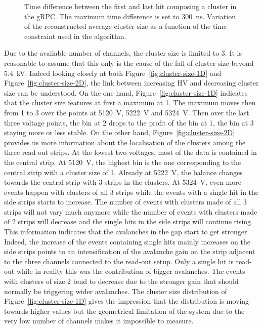 \begin{figure}[H]
\begin{subfigure}{.5\linewidth}
			\caption{\label{fig:avalanche-growth:B}}
		\end{subfigure}
		\caption{\label{fig:avalanche-growth}  Time difference between the first and last hit composing a cluster in the gRPC. The maximum time difference is set to \SI{300}{ns}.  Variation of the reconstructed average cluster size as a function of the time constraint used in the algorithm.}
	\end{figure}
	
	Due to the available number of channels, the cluster size is limited to 3. It is reasonable to assume that this only is the cause of the fall of cluster size beyond \SI{5.4}{kV}. Indeed looking closely at both Figure~\ref{fig:cluster-size-1D} and Figure~\ref{fig:cluster-size-2D}, the link between increasing HV and decreasing cluster size can be understood. On the one hand, Figure~\ref{fig:cluster-size-1D} indicates that the cluster size features at first a maximum at 1. The maximum moves then from 1 to 3 over the points at \SI{5120}{V}, \SI{5222}{V} and \SI{5324}{V}. Then over the last three voltage points, the bin at 2 drops to the profit of the bin at 1, the bin at 3 staying more or less stable. On the other hand, Figure~\ref{fig:cluster-size-2D} provides us more information about the localisation of the clusters among the three read-out strips. At the lowest two voltages, most of the data is contained in the central strip. At \SI{5120}{V}, the highest bin is the one corresponding to the central strip with a cluster size of 1. Already at \SI{5222}{V}, the balance changes towards the central strip with 3 strips in the clusters. At \SI{5324}{V}, even more events happen with clusters of all 3 strips while the events with a single hit in the side strips starts to increase. The number of events with clusters made of all 3 strips will not vary much anymore while the number of events with clusters made of 2 strips will decrease and the single hits in the side strips will continue rising. This information indicates that the avalanches in the gap start to get stronger. Indeed, the increase of the events containing single hits mainly increases on the side strips points to an intensification of the avalanche gain on the strip adjacent to the three channels connected to the read-out setup. Only a single hit is read-out while in reality this was the contribution of bigger avalanches. The events with clusters of size 2 tend to decrease due to the stronger gain that should normally be triggering wider avalanches. The cluster size distribution of Figure~\ref{fig:cluster-size-1D} gives the impression that the distribution is moving towards higher values but the geometrical limitation of the system due to the very low number of channels makes it impossible to measure.
	
